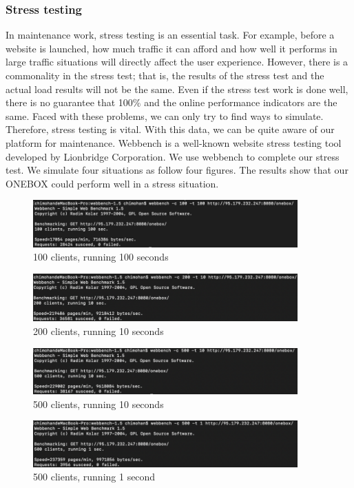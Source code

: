 \documentclass[12pt,a4]{article}
\begin{document}
\subsubsection{Stress testing}\label{4.4.3}
In maintenance work, stress testing is an essential task. For example, before a website is launched, how much traffic it can afford and how well it performs in large traffic situations will directly affect the user experience. However, there is a commonality in the stress test; that is, the results of the stress test and the actual load results will not be the same. Even if the stress test work is done well, there is no guarantee that 100\% and the online performance indicators are the same. Faced with these problems, we can only try to find ways to simulate. Therefore, stress testing is vital. With this data, we can be quite aware of our platform for maintenance. Webbench is a well-known website stress testing tool developed by Lionbridge Corporation.
We use webbench to complete our stress test. We simulate four situations as follow four figures. The results show that our ONEBOX could perform well in a stress situation.
\begin{figure}[h]%
		\centering  %
		\includegraphics[width=4in]{figure/4331}  	%
		\caption{100 clients, running 100 seconds}   %
		\end{figure}
\begin{figure}[h]%
		\centering  %
		\includegraphics[width=4in]{figure/4332}  	%
		\caption{200 clients, running 10 seconds}   %
		\end{figure}
\begin{figure}[h]%
		\centering  %
		\includegraphics[width=4in]{figure/4333}  	%
		\caption{500 clients, running 10 seconds}   %
		\end{figure}
\begin{figure}[h]%
		\centering  %
		\includegraphics[width=4in]{figure/4334}  	%
		\caption{500 clients, running 1 second}   %
		\end{figure}
\end{document}
